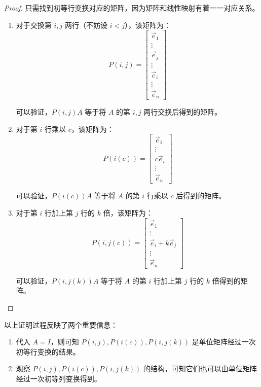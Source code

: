 \begin{proof}
	只需找到初等行变换对应的矩阵，因为矩阵和线性映射有着一一对应关系。
	\begin{enumerate}
		\item 对于交换第 $i, j$ 两行（不妨设 $i < j$），该矩阵为：
		$$
		P(i, j) =
		\begin{bmatrix}
			\vec e_1 \\ \vdots \\ \vec e_j \\ \vdots \\ \vec e_i \\ \vdots \\ \vec e_n
		\end{bmatrix}
		$$

		可以验证，$P(i, j) A$ 等于将 $A$ 的第 $i, j$ 两行交换后得到的矩阵。

		\item 对于第 $i$ 行乘以 $c$，该矩阵为：
		$$
		P(i(c)) =
		\begin{bmatrix}
			\vec e_1 \\ \vdots \\ c \vec e_i \\ \vdots \\ \vec e_n
		\end{bmatrix}
		$$

		可以验证，$P(i(c)) A$ 等于将 $A$ 的第 $i$ 行乘以 $c$ 后得到的矩阵。

		\item 对于第 $i$ 行加上第 $j$ 行的 $k$ 倍，该矩阵为：
		$$
		P(i, j(c)) =
		\begin{bmatrix}
			\vec e_1 \\ \vdots \\ \vec e_i + k \vec e_j \\ \vdots \\ \vec e_n
		\end{bmatrix}
		$$

		可以验证，$P(i, j(k)) A$ 等于将 $A$ 的第 $i$ 行加上第 $j$ 行的 $k$ 倍得到的矩阵。
	\end{enumerate}
\end{proof}

以上证明过程反映了两个重要信息：
\begin{enumerate}
	\item 代入 $A = I$，则可知 $P(i, j), P(i(c)), P(i, j(k))$ 是单位矩阵经过一次初等行变换的结果。
	\item 观察 $P(i, j), P(i(c)), P(i, j(k))$ 的结构，可知它们也可以由单位矩阵经过一次初等列变换得到。
\end{enumerate}


